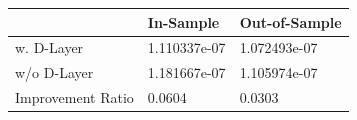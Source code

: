 \begin{tabular}{lll}
\toprule
 & In-Sample & Out-of-Sample \\
\midrule
w. D-Layer & 1.110337e-07 & 1.072493e-07 \\
w/o D-Layer & 1.181667e-07 & 1.105974e-07 \\
Improvement Ratio & 0.0604 & 0.0303 \\
\bottomrule
\end{tabular}
